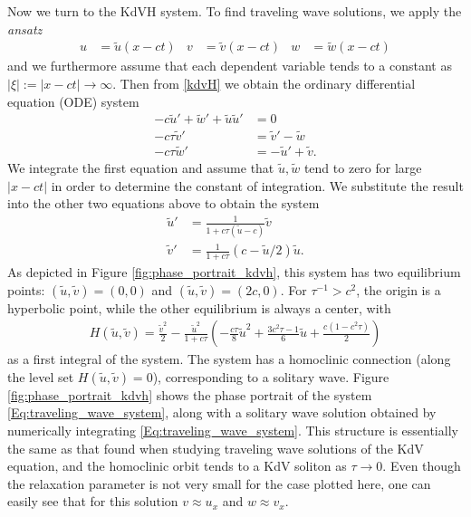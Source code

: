 \documentclass{article}
\newcommand{\ut}{\tilde{u}}
\newcommand{\vt}{\tilde{v}}
\newcommand{\wt}{\tilde{w}}
\begin{document}
Now we turn to the KdVH system.  To find traveling wave solutions, we apply the \emph{ansatz}
\begin{align} \label{tw-ansatz}
    u & = \ut(x-ct) & v & = \vt(x-ct) & w & = \wt(x-ct)
\end{align}
and we furthermore assume that each dependent variable tends
to a constant as $|\xi| := |x-ct|\to \infty$.
Then from \eqref{kdvH} we obtain the ordinary differential equation (ODE) system
\begin{subequations}
\begin{align}
    -c \ut' + \wt' + \ut \ut' & = 0 \label{Eq:kdvh_wave_ode_a} \\
    -c\tau \vt' & = \vt'-\wt \label{Eq:kdvh_wave_ode_b} \\
    -c \tau \wt' & = -\ut' + \vt. \label{Eq:kdvh_wave_ode_c}
\end{align}
\end{subequations}
We integrate the first equation and assume that $\ut, \wt$ tend to zero for large
$|x-ct|$ in order to determine the constant of integration.  We substitute
the result into the other two equations above to obtain the system
\begin{subequations}\label{Eq:traveling_wave_system}
\begin{align}
    \ut' & = \frac{1}{1+c\tau(\ut-c)} \vt \label{utilde-prime} \\
    \vt' & = \frac{1}{1+c\tau} (c-\ut/2) \ut. \label{vtilde-prime}
\end{align}
\end{subequations}
As depicted in Figure \ref{fig:phase_portrait_kdvh}, this system has two equilibrium points: $(\ut,\vt)=(0,0)$ and
$(\ut,\vt)=(2c,0)$.  For $\tau^{-1} > c^2$, the origin is a
hyperbolic point, while the other equilibrium is always a
center, with
\begin{align*}
 H(\ut, \vt) = \frac{\vt^2}{2} - \frac{\ut^2}{1+c\tau}\left(-\frac{c\tau} 8 \ut^2 + \frac{3c^2\tau-1}{6} \ut + \frac{c(1-c^2\tau)}2\right)
\end{align*}
as a first integral of the system. The system has a homoclinic connection (along the level set $H(\ut, \vt) = 0$), corresponding to a
solitary wave. Figure \ref{fig:phase_portrait_kdvh} shows the phase portrait of the system \eqref{Eq:traveling_wave_system},
along with a solitary wave solution obtained by numerically integrating \eqref{Eq:traveling_wave_system}.
This structure is essentially the same as that found when studying traveling wave solutions
of the KdV equation, and the homoclinic orbit tends to a KdV soliton as $\tau\to 0$.
Even though the relaxation parameter is not very small for the case plotted here, one can easily see that
for this solution $v\approx u_x$ and $w\approx v_x$.
\end{document}
